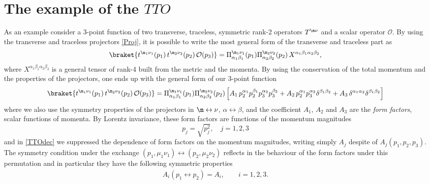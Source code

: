 \documentclass[a4paper,11pt,openright,twoside]{book}
\newcommand{\mO}{\mathcal{O}}
\let\a=\alpha   \let\b=\beta   \let\g=\gamma   \let\d=\delta
\let\n=\nu      \let\x=\xi     \let\p=\pi      \let\r=\rho
\numberwithin{equation}{section}
\begin{document}
{{%
\section{The example of the $TTO$}
As an example consider a 3-point function of two transverse, traceless, symmetric rank-2 operators $T^{\m\n}$ and a scalar operator $\mO$.
By using the transverse and traceless projectors \eqref{Proj}, it is possible to write the most general form of the transverse and traceless part as
\begin{equation}
	\braket{t^{\m_1\n_1}(p_1)\,t^{\m_2\n_2}(p_2)\,\mO(p_3)}=\Pi^{\m_1\n_1}_{\a_1\b_1}(p_1)\Pi^{\m_2\n_2}_{\a_2\b_2}(p_2)\,X^{\a_1\b_1\a_2\b_2},\label{decomp}
\end{equation}
where $X^{\a_1\b_1\a_2\b_2}$ is a general tensor of rank-4 built from the metric and the momenta. By using the conservation of the total momentum and the properties of the projectors, one ends up with the general form of our 3-point function 
\begin{equation}
	\braket{t^{\m_1\n_1}(p_1)\,t^{\m_2\n_2}(p_2)\,\mO(p_3)}=\Pi^{\m_1\n_1}_{\a_1\b_1}(p_1)\Pi^{\m_2\n_2}_{\a_2\b_2}(p_2)\left[A_1\,p_2^{\a_1}p_2^{\b_1}p_3^{\a_2}p_3^{\b_2}+A_2\,p_2^{\a_1}p_3^{\a_2}\d^{\b_1\b_2}+A_3\,\d^{\a_1\a_2}\d^{\b_1\b_2}\right]\label{TTOdec}
\end{equation}
where we also use the symmetry properties of the projectors in $\m\leftrightarrow\n$, $\a\leftrightarrow\b$, and the coefficient $A_1$, $A_2$ and $A_3$ are the \emph{form factors}, scalar functions of momenta. By Lorentz invariance, these form factors are functions of the momentum magnitudes
\begin{equation}
	p_j=\sqrt{p_j^2},\quad j=1,2,3
\end{equation} 
and in \eqref{TTOdec} we suppressed the dependence of form factors on the momentum magnitudes, writing simply $A_j$ despite of $A_j(p_1,p_2,p_3)$. The symmetry condition under the exchange $(p_1,\mu_1\nu_1)\leftrightarrow(p_2,\mu_2\nu_2)$ reflects in the behaviour of the form factors under this permutation and in particular they have the following symmetric properties
\begin{align}
	A_i(p_1\leftrightarrow p_2)=A_i, \qquad i=1,2,3. \label{symA}
\end{align}


}}
\end{document}
